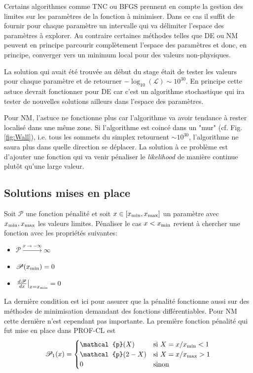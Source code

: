 \documentclass[a4paper,11pt]{article}
\numberwithin{equation}{section}
\begin{document}
	Certains algorithmes comme TNC ou BFGS prennent en compte la gestion des limites sur les paramètres de la fonction à minimiser. Dans ce cas il suffit de fournir pour chaque paramètre un intervalle qui va délimiter l'espace des paramètres à explorer. Au contraire certaines méthodes telles que DE ou NM peuvent en principe parcourir complètement l'espace des paramètres et donc, en principe, converger vers un minimum local pour des valeurs non-physiques.\par
	La solution qui avait été trouvée au début du stage était de tester les valeurs pour chaque paramètre et de retourner $- \log_{10} (\mathscr{L}) \sim 10^{30}$. En principe cette astuce devrait fonctionner pour DE car c'est un algorithme stochastique qui ira tester de nouvelles solutions ailleurs dans l'espace des paramètres. \par
	Pour NM, l'astuce ne fonctionne plus car l'algorithme va avoir tendance à rester localisé dans une même zone. Si l'algorithme est coincé dans un "mur" (cf. Fig.\ref{fig:Wall}), i.e. tous les sommets du simplex retournent $\sim 10^{30}$, l'algorithme ne saura plus dans quelle direction se déplacer. La solution à ce problème est d'ajouter une fonction qui va venir pénaliser le \textit{likelihood} de manière continue plutôt qu'une large valeur. 
	
	\subsection{Solutions mises en place}	
	Soit $\mathscr{P}$ une fonction pénalité et soit $x \in [x_{\rm{min}} , x_{\rm{max}}]$ un paramètre avec $x_{\rm{min}} ,x_{\rm{max}}$ les valeurs limites. Pénaliser le cas $x < x_{\rm{min}}$ revient à chercher une fonction avec les propriétés suivantes:
  \begin{itemize}
    \item $\mathscr{P} \xrightarrow{x \rightarrow -\infty} \infty$
    \item $\mathscr{P} (x_{\rm{min}}) = 0$
    \item $\left. \frac{d\mathscr{P}}{dx} \right | _{x=x_{\rm{min}}} = 0$
  \end{itemize}
  
  La dernière condition est ici pour assurer que la pénalité fonctionne aussi sur des méthodes de minimisation demandant des fonctions différentiables. Pour NM cette dernière n'est cependant pas importante. La première fonction pénalité qui fut mise en place dans PROF-CL est
  \begin{equation}
    \mathscr{P}_1(x) = 
    \begin{cases}    
      \mathcal{p} (X) & \mbox{si } X = x / x_{\rm{min}} < 1\\
      \mathcal{p} (2-X) & \mbox{si } X = x / x_{\rm{max}} > 1 \\
      0 & \mbox{sinon}
    \end{cases}
  \end{equation}
  
\end{document}
